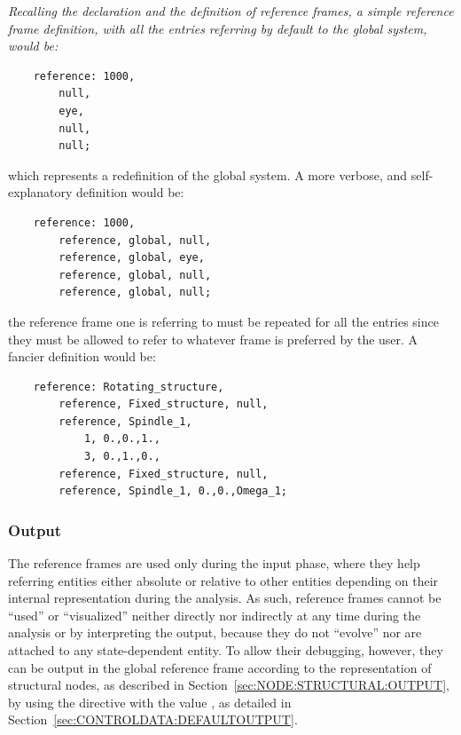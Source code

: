 {\em
    Recalling the declaration and the definition of reference frames,
    a simple reference frame definition, with all the entries referring 
    by default to the global system, would be:
    \begin{verbatim}
    reference: 1000,
        null,
        eye,
        null,
        null;
    \end{verbatim}
    which represents a redefinition of the global system.
    A more verbose, and self-explanatory definition would be:
    \begin{verbatim}
    reference: 1000,
        reference, global, null,
        reference, global, eye,
        reference, global, null,
        reference, global, null;			 
    \end{verbatim}
    the reference frame one is referring to must be repeated for all the entries
    since they must be allowed to refer to whatever frame is preferred 
    by the user.
    A fancier definition would be:
    \begin{verbatim}
    reference: Rotating_structure, 
        reference, Fixed_structure, null,
        reference, Spindle_1,
            1, 0.,0.,1., 
            3, 0.,1.,0.,
        reference, Fixed_structure, null,
        reference, Spindle_1, 0.,0.,Omega_1;
    \end{verbatim}
}

\subsubsection{Output}
The reference frames are used only during the input phase, 
where they help referring entities either absolute 
or relative to other entities depending on their internal representation
during the analysis.
As such, reference frames cannot be ``used'' or ``visualized'' neither 
directly nor indirectly at any time during the analysis or by interpreting
the output, because they do not ``evolve'' nor are attached
to any state-dependent entity.
To allow their debugging, however, they can be output in the global
reference frame according to the representation of structural nodes,
as described in Section~\ref{sec:NODE:STRUCTURAL:OUTPUT}, 
by using the  directive 
with the value , as detailed
in Section~\ref{sec:CONTROLDATA:DEFAULTOUTPUT}.




